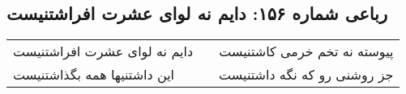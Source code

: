 \begin{center}
\section*{رباعی شماره ۱۵۶: دایم نه لوای عشرت افراشتنیست}
\label{sec:sh156}
\begin{longtable}{l p{0.5cm} r}
دایم نه لوای عشرت افراشتنیست
&&
پیوسته نه تخم خرمی کاشتنیست
\\
این داشتنیها همه بگذاشتنیست
&&
جز روشنی رو که نگه داشتنیست
\\
\end{longtable}
\end{center}
